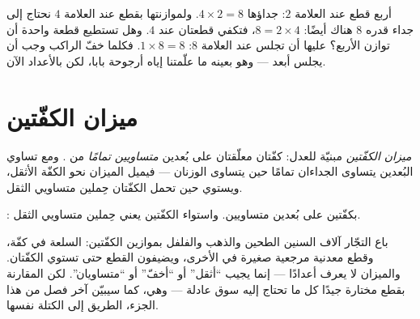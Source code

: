 \begin{example}\label{ex:g3:levers-and-scales:using}
أربع قطع عند العلامة $2$: جداؤها $4 \times 2 = 8$. ولموازنتها
بقطع عند العلامة $4$ نحتاج إلى جداء قدره $8$ هناك أيضًا:
$8 = 2 \times 4$، فتكفي قطعتان عند $4$. وهل تستطيع قطعة واحدة أن
توازن الأربع؟ عليها أن تجلس عند العلامة $8$: $1 \times 8 = 8$.
فكلما خفّ الراكب وجب أن يجلس أبعد --- وهو بعينه ما علّمتنا إياه
أرجوحة بابا، لكن بالأعداد الآن.
\end{example}

\section{ميزان الكفّتين}

\begin{definition}\label{def:g3:levers-and-scales:scale}
\emph{ميزان الكفّتين}  مبنيّة للعدل:
كفّتان معلّقتان على بُعدين \emph{متساويين تمامًا} من . ومع تساوي البُعدين يتساوى الجداءان تمامًا حين يتساوى
الوزنان --- فيميل الميزان نحو الكفّة الأثقل، ويستوي حين تحمل
الكفّتان حِملين متساويي الثقل.
\end{definition}

\begin{omfigure}

{\small {}:  بكفّتين على بُعدين متساويين.
واستواء الكفّتين يعني حِملين متساويي الثقل.}
\end{omfigure}

\begin{example}\label{ex:g3:levers-and-scales:weighing}
باع التجّار آلاف السنين الطحين والذهب والفلفل بموازين الكفّتين:
السلعة في كفّة، وقطع معدنية مرجعية صغيرة في الأخرى، ويضيفون القطع
حتى تستوي الكفّتان. والميزان لا يعرف أعدادًا --- إنما يجيب
``أثقل'' أو ``أخفّ'' أو ``متساويان''. لكن المقارنة بقطع مختارة
جيدًا كل ما تحتاج إليه سوق عادلة --- وهي، كما سيبيّن آخر فصل من
هذا الجزء، الطريق إلى  الكتلة نفسها.
\end{example}

